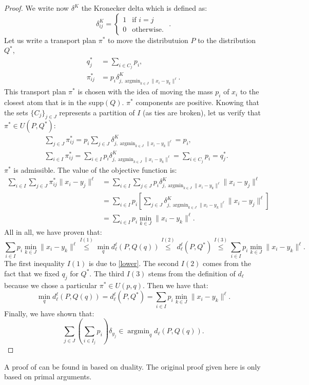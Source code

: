 \documentclass{amsart}
\newcommand{\argmin}{\mathop{\arg\min}}
\begin{document}
\begin{proof}
\noindent We write now $\delta^K$ the Kronecker delta which is defined as: $$\delta^K_{ij} = \begin{cases} 
      1 & \text{if } i=j \\
      0 & \text{otherwise. } 
   \end{cases}.$$
Let us write a transport plan $\pi^*$ to move the distributuion $P$ to the distribution $Q^*$,
\begin{align*}
    q_j^*&=\sum_{i\in C_j}p_i, \\
    \pi_{ij}^*&=p_i\delta^K_{j,\argmin_{k\in J}\lVert x_i-y_k\rVert^\ell}.
\end{align*}
\noindent This transport plan $\pi^*$ is chosen with the idea of moving the mass $p_i$ of $x_i$ to the closest atom that is in the supp$\left(Q\right)$. $\pi^*$ components are positive. Knowing that the sets $\{C_j\}_{j\in J}$ represents a partition of $I$ (as ties are broken), let us verify that $\pi^*\in U\left(P,Q^*\right)$:
\begin{align*}
    &\sum_{j\in J}\pi^*_{ij}=p_i\sum_{j\in J}\delta^K_{j,\argmin_{k\in J}\lVert x_i-y_k\rVert^\ell}=p_i, \\
    &\sum_{i\in I}\pi^*_{ij}=\sum_{i\in I}p_i\delta^K_{j,\argmin_{k\in J}\lVert x_i-y_k\rVert^\ell}=\sum_{i\in C_j}p_i=q_j^*.
\end{align*} $\pi^*$ is admissible. The value of the objective function is: 
\begin{align*}
    \sum_{i\in I}\sum_{j\in J}\pi^*_{ij}\lVert x_i-y_j\rVert^\ell &=\sum_{i\in I}\sum_{j\in J}p_i\delta^K_{j, \argmin_{k\in J}\lVert x_i-y_k\rVert^\ell}\lVert x_i-y_j\rVert^\ell \\ &=\sum_{i\in I}p_i\left[\sum_{j\in J}\delta^K_{j, \argmin_{k\in J}\lVert x_i-y_k\rVert^\ell}\lVert x_i-y_j\rVert^\ell\right] \\ &=\sum_{i\in I}p_i\min_{k\in J}\lVert x_i-y_k\rVert^\ell.
\end{align*}
All in all, we have proven that:
$$
\sum_{i\in I}p_i\min_{k\in J}\lVert x_i-y_k\rVert ^\ell\overset{I(1)}{\leq} \min_{q} d_\ell^\ell\left(P,Q\left(q\right)\right)\overset{I(2)}{\leq} d_\ell^\ell\left(P,Q^*\right) \overset{I(3)}{\leq} \sum_{i\in I}p_i\min_{k\in J}\lVert x_i-y_k\rVert ^\ell.
$$
The first inequality $I(1)$ is due to \ref{lower}. The second $I(2)$ comes from the fact that we fixed $q_j$ for $Q^*$. The third $I(3)$ stems from the definition of $d_\ell$ because we chose a particular $\pi^*\in U\left(p,q\right)$. Then we have that:
$$
\min_{q} d_\ell^\ell\left(P,Q\left(q\right)\right)= d_\ell^\ell\left(P,Q^*\right)= \sum_{i\in I}p_i\min_{k\in J}\lVert x_i-y_k\rVert ^\ell.
$$
Finally, we have shown that:
$$\sum_{j\in J}\left(\sum_{i\in I_j}p_i\right)\delta_{y_j}\in \argmin_q d_\ell\left(P,Q\left(q\right)\right).$$
\end{proof}
\begin{remark}
    A proof of  can be found in \cite{dupacova_scenario_2003} based on duality. The original proof given here is only based on primal arguments.
\end{remark}
\end{document}
